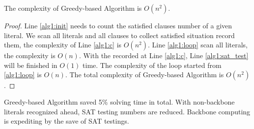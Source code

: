 \begin{theorem}
The complexity of Greedy-based Algorithm is $O(n^2)$.
\end{theorem}

\begin{proof}
Line \ref{alg1:init} needs to count the satisfied clauses number of a given literal. We scan all literals and all clauses to collect satisfied situation record them, the complexity of Line \ref{alg1:c} is $O(n^2)$. Line \ref{alg1:loop} scan all literals, the complexity is $O(n)$. With the recorded at Line \ref{alg1:c}, Line \ref{alg1:sat_test} will be finished in $O(1)$ time. The complexity of the loop started from \ref{alg1:loop} is $O(n)$. The total complexity of Greedy-based Algorithm is $O(n^2)$.
\end{proof}

Greedy-based Algorithm saved 5\% solving time in total. With non-backbone literals recognized ahead, SAT testing numbers are reduced. Backbone computing is expediting by the save of SAT testings.
